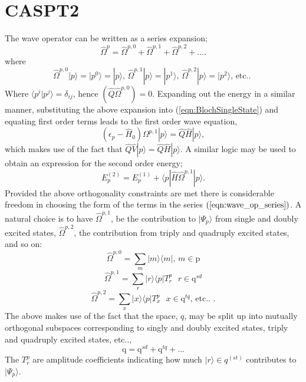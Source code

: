 \section{ CASPT2 }
\noindent The wave operator can be written as a series expansion;
\begin{equation}
\hat{\Omega}^{p} = \hat{\Omega}^{p,0}+\hat{\Omega}^{p,1}+\hat{\Omega}^{p,2}+....
\end{equation} 
where 
\begin{equation}
\hat{\Omega}^{p,0}|p\rangle = |p^{0}\rangle = |p\rangle \text{, \ \  }
\hat{\Omega}^{p,1}|p\rangle = |p^{1}\rangle \text{, \ \ }
\hat{\Omega}^{p,2}|p\rangle = |p^{2}\rangle \text{, \  etc.. }
\label{eqn:wave_op_series}
\end{equation} 
Where  $\langle p^{i} | p^{j} \rangle=  \delta_{ij}$,  hence $(\hat{Q}\hat{\Omega}^{p,0}) = 0$.
Expanding out the energy in a similar manner,
substituting the above expansion into (\ref{eqn:BlochSingleState}) and equating first order terms leads to the first order
wave equation,
\begin{equation}
(\epsilon_{p} - \hat{H}_{0} )\Omega^{p,1}|p\rangle = \hat{Q}\hat{H}|p\rangle ,
\label{eqn:Bloch_singlestate_firstorder}
\end{equation}
which makes use of the fact that $ \hat{Q}\hat{V}|p\rangle= \hat{Q}\hat{H}|p\rangle$. A similar logic may be
used to obtain an expression for the second order energy;
\begin{equation}
E_{p}^{(2)} = E_{p}^{(1)} + \langle p | \hat{H} \hat{\Omega}^{p,1}| p \rangle .
\label{eqn:single_state_ptE_second_order}
\end{equation}
Provided the above orthogonality constraints are met there is considerable freedom in choosing the form of the terms in the
series $(\ref{eqn:wave_op_series})$.  A natural choice is to have $\hat{\Omega}^{p,1}$, be the contribution
to $|\Psi_{p}\rangle$ from single and doubly excited states, $\hat{\Omega}^{p,2}$,  the contribution from triply
and quadruply excited states, and so on:
\begin{equation*}
\hat{\Omega}^{p,0} = \sum_{m} |m \rangle \langle m |   \text{, \ \ \  } m \in \mathrm{p}
\end{equation*}
\begin{equation*}
\hat{\Omega}^{p,1} = \sum_{r}| r \rangle \langle p | T^{p}_{r} \text{ \ \ \ } r \in \mathrm{q}^{sd} 
\end{equation*}
\begin{equation*}
\hat{\Omega}^{p,2} = \sum_{x}| x \rangle \langle p | T^{p}_{x} \text{ \ \ \ } x \in \mathrm{q}^{tq}  \text{, \  etc.. }.
\end{equation*}
The above makes use of the fact that the space, $q$, may be split up into mutually orthogonal 
subspaces corresponding to singly and doubly excited states, triply and quadruply excited states, etc..,
\begin{equation}
\mathrm{q} = \mathrm{q}^{sd} + \mathrm{q}^{tq} + ...
\end{equation}
The $T^{p}_{r}$ are amplitude coefficients indicating how much $|r\rangle \in q^{(st)}$
contributes to $|\Psi_{p}\rangle$.\\

